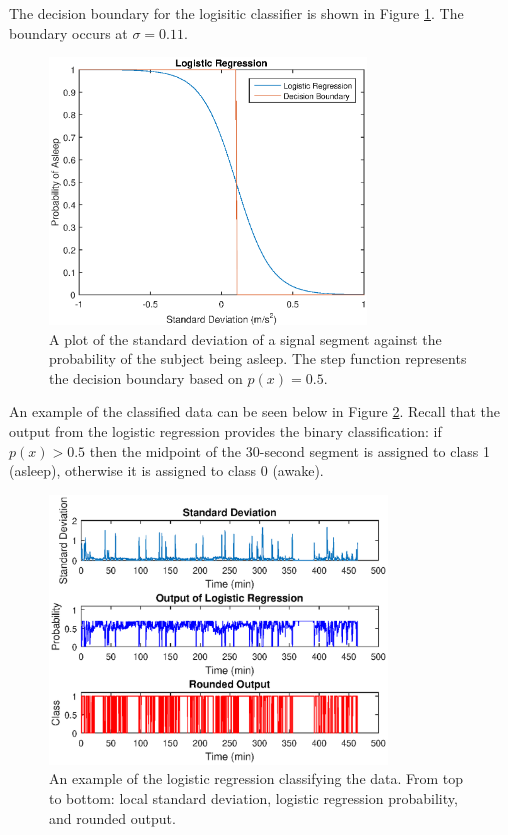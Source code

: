                 The decision boundary for the logisitic classifier is shown in Figure \ref{img_regression}. The boundary occurs at $\sigma = 0.11$.

                \begin{figure}[h]
                    \includegraphics[width=0.75\textwidth]{Images/logistic_regression.eps}
                    \centering
                    \caption{A plot of the standard deviation of a signal segment against the probability of the subject being asleep. The step function represents the decision boundary based on $p(x) = 0.5$.}
                    \label{img_regression}
                \end{figure}

                An example of the classified data can be seen below in Figure \ref{img_regression_ex}. Recall that the output from the logistic regression provides the binary classification: if $p(x) > 0.5$ then the midpoint of the 30-second segment is assigned to class 1 (asleep), otherwise it is assigned to class 0 (awake).

                \begin{figure}[h]
                    \includegraphics[width=0.8\textwidth]{Images/logistic_regression_ex.eps}
                    \centering
                    \caption{An example of the logistic regression classifying the data. From top to bottom: local standard deviation, logistic regression probability, and rounded output.}
                    \label{img_regression_ex}
                \end{figure}


